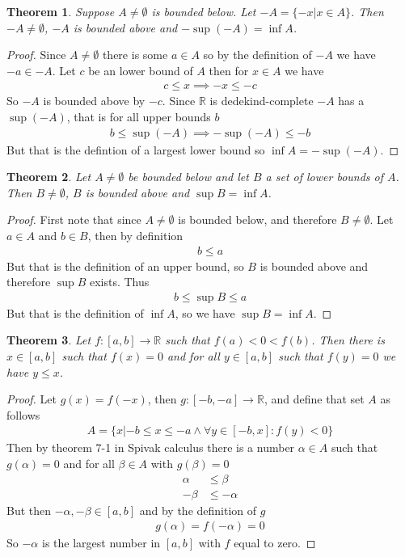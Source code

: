 \documentclass{article}
\theoremstyle{plain}
\newtheorem{theorem}{Theorem}
\theoremstyle{definition}
\begin{document}
\begin{theorem}
	Suppose $A \neq \emptyset$ is bounded below. Let $-A = \{-x|x\in A\}$. Then
	$-A \neq \emptyset$, $-A$ is bounded above and $-\sup(-A) = \inf A$.
\end{theorem}
\begin{proof}
	Since $A \neq \emptyset$ there is some $a \in A$ so by the definition of
	$-A$ we have $-a \in -A$. Let $c$ be an lower bound of $A$ then for $x \in
	A$ we have
	\begin{align*}
		c \leq x \implies -x \leq -c
	\end{align*}
	So $-A$ is bounded above by $-c$. Since $\mathbb{R}$ is dedekind-complete
	$-A$ has a $\sup(-A)$, that is for all upper bounds $b$
	\begin{align*}
		b \leq \sup(-A) \implies -\sup(-A) \leq -b
	\end{align*}
	But that is the defintion of a largest lower bound so $\inf A = -\sup(-A)$.
\end{proof}
\begin{theorem}
	Let $A \neq \emptyset$ be bounded below and let $B$ a set of lower bounds of
	$A$. Then $B \neq \emptyset$, $B$ is bounded above and $\sup B = \inf
	A$.
\end{theorem}
\begin{proof}
	First note that since $A \neq \emptyset$ is bounded below, and therefore $B
	\neq \emptyset$. Let $a \in A$ and $b \in B$, then by definition
	\begin{align*}
		b \leq a
	\end{align*}
	But that is the definition of an upper bound, so $B$ is bounded above and
	therefore $\sup B$ exists. Thus
	\begin{align*}
		b \leq \sup B \leq a
	\end{align*}
	But that is the definition of $\inf A$, so we have $\sup B = \inf A$.
\end{proof}
\begin{theorem}
	Let $f: [a,b] \rightarrow \mathbb{R}$ such that $f(a) < 0 < f(b)$. Then
	there is $x \in [a,b]$ such that $f(x)=0$ and for all $y \in [a,b]$ such
	that $f(y)=0$ we have $y \leq x$.
\end{theorem}
\begin{proof}
	Let $g(x) = f(-x)$, then $g: [-b,-a] \rightarrow \mathbb{R}$,
	and define that set $A$ as follows
	\begin{align*}
		A = \{x|-b \leq x \leq -a \land \forall y \in [-b,x]: f(y)<0\}
	\end{align*}
	Then by theorem 7-1 in Spivak calculus there is a number $\alpha \in A$ such
	that $g(\alpha)=0$ and for all $\beta \in A$ with $g(\beta) = 0$
	\begin{align*}
		\alpha &\leq \beta \\
		-\beta &\leq -\alpha
	\end{align*}
	But then $-\alpha,-\beta \in [a,b]$ and by the definition of $g$
	\begin{align*}
		g(\alpha) = f(-\alpha) = 0
	\end{align*}
	So $-\alpha$ is the largest number in $[a,b]$ with $f$ equal to zero.
\end{proof}
\end{document}
